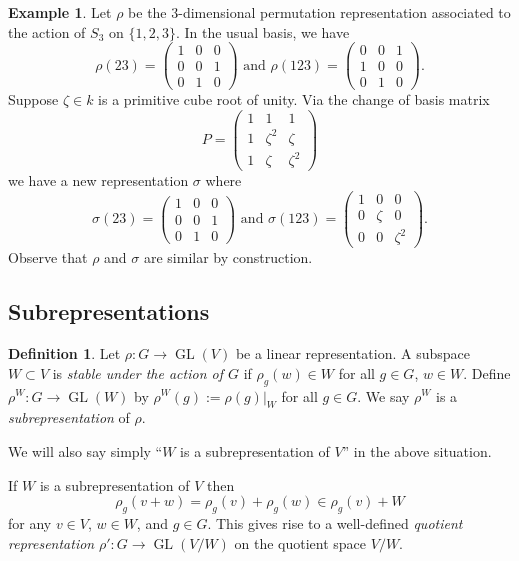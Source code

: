 \documentclass[12pt]{article}
\theoremstyle{plain}
\theoremstyle{definition}
\newtheorem{definition}[theorem]{Definition}
\newtheorem{example}[theorem]{Example}
\theoremstyle{remark}
\numberwithin{equation}{section}
\begin{document}
\begin{example} \label{ex:S3_decomposition}
Let $\rho$ be the $3$-dimensional permutation representation associated to
the action of $S_3$ on $\{1,2,3\}$.
In the usual basis, we have
\[
\rho(23) = \begin{pmatrix} 1&0&0\\ 0&0&1 \\ 0&1&0 \end{pmatrix}
\textrm{ and }
\rho(123) = \begin{pmatrix} 0&0&1\\1&0&0\\0&1&0 \end{pmatrix}.
\]
Suppose $\zeta \in k$ is a primitive cube root of unity.
Via the change of basis matrix
\[
P = \begin{pmatrix} 1&1&1\\ 1&\zeta^2&\zeta\\1&\zeta&\zeta^2 \end{pmatrix} 
\]
we have a new representation $\sigma$ where
\[
\sigma(23) = \begin{pmatrix} 1&0&0\\ 0&0&1 \\ 0&1&0 \end{pmatrix}
\textrm{ and }
\sigma(123) = \begin{pmatrix} 1&0&0\\ 0&\zeta&0 \\ 0&0&\zeta^2
\end{pmatrix} .  
\]
Observe that $\rho$ and $\sigma$ are similar by construction.
\end{example}


\subsection{Subrepresentations}

\begin{definition}
Let $\rho : G \to \operatorname{GL}(V)$ be a linear representation.
A subspace $W \subset V$ is \emph{stable under the action of $G$} if
$\rho_g(w) \in W$ for all $g \in G$, $w \in W$.
Define $\rho^W : G \to \operatorname{GL}(W)$ by $\rho^W(g) := \rho(g)|_W$ for all $g
\in G$.
We say $\rho^W$ is a \emph{subrepresentation} of $\rho$.
\end{definition}

We will also say simply ``$W$ is a subrepresentation of $V$'' in the above
situation.

If $W$ is a subrepresentation of $V$ then
\[
\rho_g(v+w) = \rho_g(v) + \rho_g(w) \in \rho_g(v)+W
\]
for any $v \in V$, $w \in W$, and $g \in G$.
This gives rise to a well-defined \emph{quotient representation}
$\rho' : G \to \operatorname{GL}(V/W)$
on the quotient space $V/W$.
\end{document}
